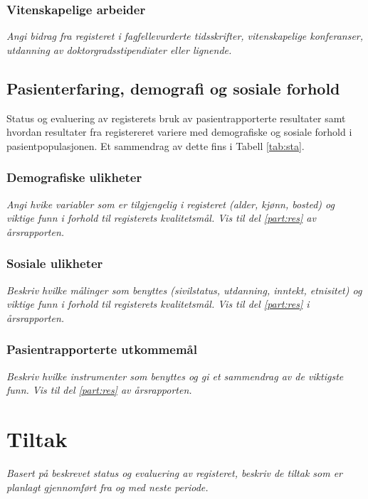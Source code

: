\documentclass[norsk, a4paper, twocolumn]{report}
\begin{document}
\section{Vitenskapelige arbeider}\label{sec:vitarb}
\textit{Angi bidrag fra registeret i fagfellevurderte tidsskrifter,
vitenskapelige konferanser, utdanning av doktorgradsstipendiater eller
lignende.}


\chapter{Pasienterfaring, demografi og sosiale forhold}\label{cha:pas}
Status og evaluering av registerets bruk av pasientrapporterte resultater samt
hvordan resultater fra registereret variere med demografiske og sosiale forhold
i pasientpopulasjonen. Et sammendrag av dette fins i Tabell \ref{tab:sta}.

\section{Demografiske ulikheter}\label{sec:demuli}
\textit{Angi hvike variabler som er tilgjengelig i registeret (alder, kjønn,
bosted) og viktige funn i forhold til registerets kvalitetsmål. Vis til del
\ref{part:res} av årsrapporten.}

\section{Sosiale ulikheter}\label{sec:sosuli}
\textit{Beskriv hvilke målinger som benyttes (sivilstatus, utdanning, inntekt,
etnisitet) og viktige funn i forhold til registerets kvalitetsmål. Vis til del
\ref{part:res} i årsrapporten.}

\section{Pasientrapporterte utkommemål}\label{sec:pasutk}
\textit{Beskriv hvilke instrumenter som benyttes og gi et sammendrag av de
viktigste funn. Vis til del \ref{part:res} av årsrapporten.}











\part{Tiltak}
\textit{Basert på beskrevet status og evaluering av registeret, beskriv de
tiltak som er planlagt gjennomført fra og med neste periode.}
\end{document}
